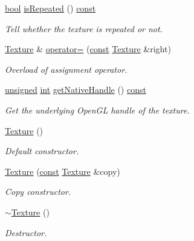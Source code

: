 \begin{DoxyCompactItemize}
\hyperlink{term__entry_8h_a002004ba5d663f149f6c38064926abac}{bool} \hyperlink{classsf_1_1_texture_a007a19b48952b7854120bf423c102150}{is\-Repeated} () \hyperlink{term__entry_8h_a57bd63ce7f9a353488880e3de6692d5a}{const} 
\begin{DoxyCompactList}\small\item\em Tell whether the texture is repeated or not. \end{DoxyCompactList}\item 
\hyperlink{classsf_1_1_texture}{Texture} \& \hyperlink{classsf_1_1_texture_a80a089b6b19bb09b83012d5f0e6af9ba}{operator=} (\hyperlink{term__entry_8h_a57bd63ce7f9a353488880e3de6692d5a}{const} \hyperlink{classsf_1_1_texture}{Texture} \&right)
\begin{DoxyCompactList}\small\item\em Overload of assignment operator. \end{DoxyCompactList}\item 
\hyperlink{curses_8priv_8h_aca40206900cfc164654362fa8d4ad1e6}{unsigned} \hyperlink{term__entry_8h_ad65b480f8c8270356b45a9890f6499ae}{int} \hyperlink{classsf_1_1_texture_a14526d89b9008a3d851dc7b5e9532450}{get\-Native\-Handle} () \hyperlink{term__entry_8h_a57bd63ce7f9a353488880e3de6692d5a}{const} 
\begin{DoxyCompactList}\small\item\em Get the underlying Open\-G\-L handle of the texture. \end{DoxyCompactList}\item 
\hyperlink{classsf_1_1_texture_a3e04674853b8533bf981db3173e3a4a7}{Texture} ()
\begin{DoxyCompactList}\small\item\em Default constructor. \end{DoxyCompactList}\item 
\hyperlink{classsf_1_1_texture_a524855cbf89de3b74be84d385fd229de}{Texture} (\hyperlink{term__entry_8h_a57bd63ce7f9a353488880e3de6692d5a}{const} \hyperlink{classsf_1_1_texture}{Texture} \&copy)
\begin{DoxyCompactList}\small\item\em Copy constructor. \end{DoxyCompactList}\item 
\hyperlink{classsf_1_1_texture_a9c5354ad40eb1c5aeeeb21f57ccd7e6c}{$\sim$\-Texture} ()
\begin{DoxyCompactList}\small\item\em Destructor. \end{DoxyCompactList}\item 

\end{DoxyCompactItemize}
